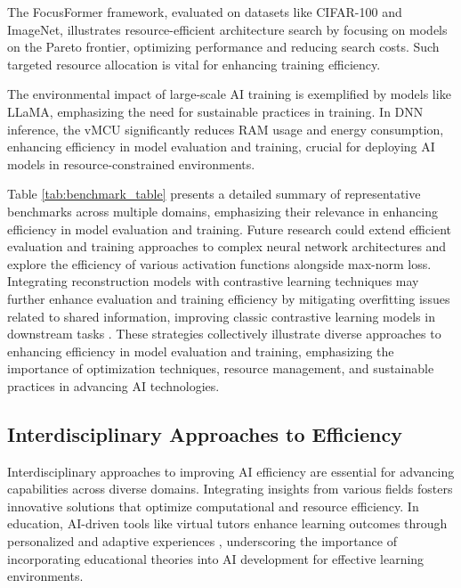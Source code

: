 The FocusFormer framework, evaluated on datasets like CIFAR-100 and ImageNet, illustrates resource-efficient architecture search by focusing on models on the Pareto frontier, optimizing performance and reducing search costs. Such targeted resource allocation is vital for enhancing training efficiency.

The environmental impact of large-scale AI training is exemplified by models like LLaMA, emphasizing the need for sustainable practices in training. In DNN inference, the vMCU significantly reduces RAM usage and energy consumption, enhancing efficiency in model evaluation and training, crucial for deploying AI models in resource-constrained environments.

Table \ref{tab:benchmark_table} presents a detailed summary of representative benchmarks across multiple domains, emphasizing their relevance in enhancing efficiency in model evaluation and training. Future research could extend efficient evaluation and training approaches to complex neural network architectures and explore the efficiency of various activation functions alongside max-norm loss. Integrating reconstruction models with contrastive learning techniques may further enhance evaluation and training efficiency by mitigating overfitting issues related to shared information, improving classic contrastive learning models in downstream tasks \cite{wang2022rethinkingminimalsufficientrepresentation,ginzburg2021selfsuperviseddocumentsimilarityranking}. These strategies collectively illustrate diverse approaches to enhancing efficiency in model evaluation and training, emphasizing the importance of optimization techniques, resource management, and sustainable practices in advancing AI technologies.


\subsection{Interdisciplinary Approaches to Efficiency} \label{subsec:Interdisciplinary Approaches to Efficiency}

Interdisciplinary approaches to improving AI efficiency are essential for advancing capabilities across diverse domains. Integrating insights from various fields fosters innovative solutions that optimize computational and resource efficiency. In education, AI-driven tools like virtual tutors enhance learning outcomes through personalized and adaptive experiences \cite{bassner2024irisaidrivenvirtualtutor}, underscoring the importance of incorporating educational theories into AI development for effective learning environments.

